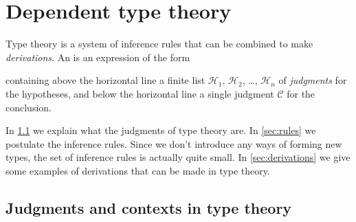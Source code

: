 \section{Dependent type theory}
\label{ch:dtt}

Type theory is a system of inference rules that can be combined to make \emph{derivations}. An  is an expression of the form
\begin{prooftree}
\end{prooftree}
containing above the horizontal line a finite list $\mathcal{H}_1$, $\mathcal{H}_2$, \dots, $\mathcal{H}_n$ of \emph{judgments} for the hypotheses, and below the horizontal line a single judgment $\mathcal{C}$ for the conclusion.

In \cref{sec:judgments} we explain what the judgments of type theory are. In \cref{sec:rules} we postulate the inference rules. Since we don't introduce any ways of forming new types, the set of inference rules is actually quite small. In \cref{sec:derivations} we give some examples of derivations that can be made in type theory.

\subsection{Judgments and contexts in type theory}\label{sec:judgments}

